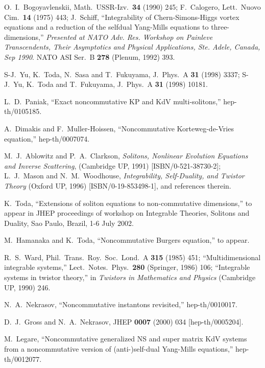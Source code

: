 \documentclass[a4paper,12pt]{article}\setlength{\topmargin}{-1cm}
\begin{document}
\begin{thebibliography}{99}
O.~I.~Bogoyavlenskii,
Math.\ USSR-Izv.\ {\bf 34} (1990) 245;
F.~Calogero,
Lett.\ Nuovo Cim.\  {\bf 14} (1975) 443;
J.~Schiff,
``Integrability of Chern-Simons-Higgs vortex equations and a reduction 
of the selfdual Yang-Mills equations to three-dimensions,''
{\it Presented at NATO Adv. Res. Workshop on Painleve Transcendents, Their 
Asymptotics and Physical Applications, Ste. Adele, Canada, Sep 1990}.
NATO ASI Ser.\ B {\bf 278} (Plenum, 1992) 393.

S-J.~Yu, K.~Toda, N.~Sasa and T.~Fukuyama,
J.\ Phys.\ A {\bf 31} (1998) 3337;
S-J.~Yu, K.~Toda and T.~Fukuyama,
J.\ Phys.\ A {\bf 31} (1998) 10181.

L.~D.~Paniak,
``Exact noncommutative KP and KdV multi-solitons,''
hep-th/0105185.

A.~Dimakis and F.~Muller-Hoissen,
``Noncommutative Korteweg-de-Vries equation,''
hep-th/0007074.

M.~J.~Ablowitz and P.~A.~Clarkson,
{\it Solitons, Nonlinear Evolution Equations and Inverse Scattering},
(Cambridge UP, 1991) [ISBN/0-521-38730-2];
L.~J.~Mason and N.~M.~Woodhouse,
{\it Integrability, Self-Duality, and Twistor Theory}
(Oxford UP, 1996)
[ISBN/0-19-853498-1], and references therein.

K.~Toda,
``Extensions of soliton equations to non-commutative \coordHE{} dimensions,''
to appear in JHEP proceedings of workshop on 
Integrable Theories, Solitons and Duality, Sao Paulo, Brazil, 1-6 July 2002. 

M.~Hamanaka and K.~Toda,
``Noncommutative Burgers equation,''
to appear.

R.~S.~Ward,
Phil.\ Trans.\ Roy.\ Soc.\ Lond.\ A {\bf 315} (1985) 451;
``Multidimensional integrable systems,''
Lect.\ Notes.\ Phys.\ {\bf 280} (Springer, 1986) 106;
``Integrable systems in twistor theory,''
in {\it Twistors in Mathematics and Physics}
(Cambridge UP, 1990) 246.

N.~A.~Nekrasov,
``Noncommutative instantons revisited,''
hep-th/0010017.

D.~J.~Gross and N.~A.~Nekrasov,
JHEP {\bf 0007} (2000) 034
[hep-th/0005204].

M.~Legare,
``Noncommutative generalized NS and super matrix KdV systems from a  
noncommutative version of (anti-)self-dual Yang-Mills equations,''
hep-th/0012077.%


\end{thebibliography}
\end{document}
